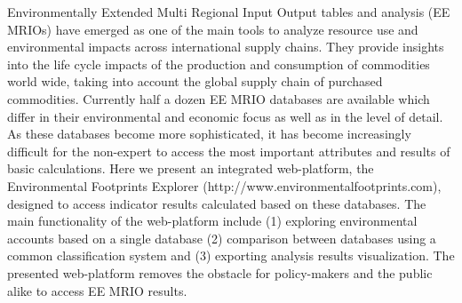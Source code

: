Environmentally Extended Multi Regional Input Output tables and analysis (EE MRIOs) have emerged as one of the main tools to analyze resource use and environmental impacts across international supply chains. They provide insights into the life cycle impacts of the production and consumption of commodities world wide, taking into account the global supply chain of purchased commodities. Currently half a dozen EE MRIO databases are available which differ in their environmental and economic focus as well as in the level of detail. As these databases become more sophisticated, it has become increasingly difficult for the non-expert to access the most important attributes and results of basic calculations. Here we present an integrated web-platform, the Environmental Footprints Explorer (http://www.environmentalfootprints.com), designed to access indicator results calculated based on these databases. The main functionality of the web-platform include (1) exploring environmental accounts based on a single database (2) comparison between databases using a common classification system and (3) exporting analysis results visualization. The presented web-platform removes the obstacle for policy-makers and the public alike to access EE MRIO results. 


    
    
  